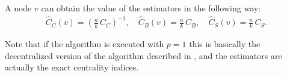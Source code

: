 A node $v$ can obtain the value of the estimators in the following way:
\begin{eqnarray*}
\widehat{C}_C(v) =  \left( \frac{n}{k} \, C_C \right)^{-1}, \quad
\widehat{C}_B(v) = \frac{n}{k} \, C_B, \quad
\widehat{C}_S(v) = \frac{n}{k} \, C_S .
\end{eqnarray*}

Note that if the algorithm is executed with $p=1$ this is basically the decentralized version of the algorithm described in \cite{brandes2001}, and the estimators are actually the exact centrality indices.